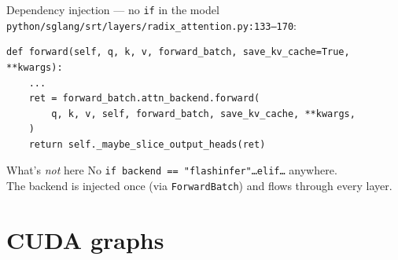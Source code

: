 \documentclass[aspectratio=169,10pt]{beamer}
\begin{document}
\begin{frame}[fragile]{Dependency injection --- no \texttt{if} in the model}
  \footnotesize
  \texttt{python/sglang/srt/layers/radix\_attention.py:133--170}:
\begin{lstlisting}
def forward(self, q, k, v, forward_batch, save_kv_cache=True, **kwargs):
    ...
    ret = forward_batch.attn_backend.forward(
        q, k, v, self, forward_batch, save_kv_cache, **kwargs,
    )
    return self._maybe_slice_output_heads(ret)
\end{lstlisting}
  \vspace{0.2cm}
  \begin{block}{What's \emph{not} here}
    \small
    No \texttt{if backend == "flashinfer"\dots elif\dots} anywhere.\\
    The backend is injected once (via \texttt{ForwardBatch}) and flows through every layer.
  \end{block}
\end{frame}

\section{CUDA graphs}
\end{document}

